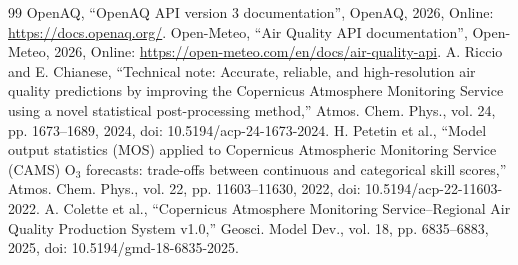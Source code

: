 \documentclass[journal]{IEEEtran}
\begin{document}
\begin{thebibliography}{99}
 {OpenAQ}, ``OpenAQ API version 3 documentation'', OpenAQ, 2026, Online: \url{https://docs.openaq.org/}.
 {Open-Meteo}, ``Air Quality API documentation'', Open-Meteo, 2026, Online: \url{https://open-meteo.com/en/docs/air-quality-api}.
 A. Riccio and E. Chianese, ``Technical note: Accurate, reliable, and high-resolution air quality predictions by improving the Copernicus Atmosphere Monitoring Service using a novel statistical post-processing method,'' Atmos. Chem. Phys., vol. 24, pp. 1673--1689, 2024, doi: 10.5194/acp-24-1673-2024.
 H. Petetin et al., ``Model output statistics (MOS) applied to Copernicus Atmospheric Monitoring Service (CAMS) O$_3$ forecasts: trade-offs between continuous and categorical skill scores,'' Atmos. Chem. Phys., vol. 22, pp. 11603--11630, 2022, doi: 10.5194/acp-22-11603-2022.
 A. Colette et al., ``Copernicus Atmosphere Monitoring Service--Regional Air Quality Production System v1.0,'' Geosci. Model Dev., vol. 18, pp. 6835--6883, 2025, doi: 10.5194/gmd-18-6835-2025.
\end{thebibliography}
\end{document}
